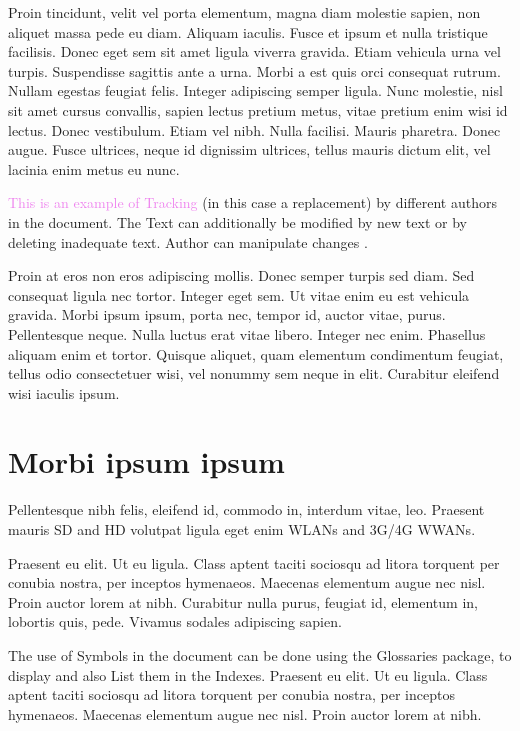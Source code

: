 Proin tincidunt, velit vel porta elementum, magna diam molestie sapien, non aliquet massa pede eu diam. Aliquam iaculis. Fusce et ipsum et nulla tristique facilisis. Donec eget sem sit amet ligula viverra gravida. Etiam vehicula urna vel turpis. Suspendisse sagittis ante a urna. Morbi a est quis orci consequat rutrum. Nullam egestas feugiat felis. Integer adipiscing semper ligula. Nunc molestie, nisl sit amet cursus convallis, sapien lectus pretium metus, vitae pretium enim wisi id lectus. Donec vestibulum. Etiam vel nibh. Nulla facilisi. Mauris pharetra. Donec augue. Fusce ultrices, neque id dignissim ultrices, tellus mauris dictum elit, vel lacinia enim metus eu nunc.

\textcolor{violet}{This is an example of Tracking}  (in this case a replacement) by different authors in the document. The Text can additionally be modified by  new text or by deleting  inadequate text. Author can manipulate changes .

Proin at eros non eros adipiscing mollis. Donec semper turpis sed diam. Sed consequat ligula nec tortor. Integer eget sem. Ut vitae enim eu est vehicula gravida. Morbi ipsum ipsum, porta nec, tempor id, auctor vitae, purus. Pellentesque neque. Nulla luctus erat vitae libero. Integer nec enim. Phasellus aliquam enim et tortor. Quisque aliquet, quam elementum condimentum feugiat, tellus odio consectetuer wisi, vel nonummy sem neque in elit. Curabitur eleifend wisi iaculis ipsum.
\section{Morbi ipsum ipsum}
Pellentesque nibh felis, eleifend id, commodo in, interdum vitae, leo. 
 Praesent mauris \ac{SD} and \ac{HD} volutpat ligula eget enim \acp{WLAN} and 3G\slash 4G \acp{WWAN}.

Praesent eu elit. Ut eu ligula. Class aptent taciti sociosqu ad litora torquent per conubia nostra, per inceptos hymenaeos. Maecenas elementum augue nec nisl. Proin auctor lorem at nibh. Curabitur nulla purus, feugiat id, elementum in, lobortis quis, pede. Vivamus sodales adipiscing sapien.

The use of Symbols in the document can be done using the Glossaries package, to display and also List them in the Indexes. 
Praesent eu elit. Ut eu ligula. Class aptent taciti sociosqu ad litora torquent per conubia nostra, per inceptos hymenaeos. Maecenas elementum augue nec nisl. Proin auctor lorem at nibh. 

